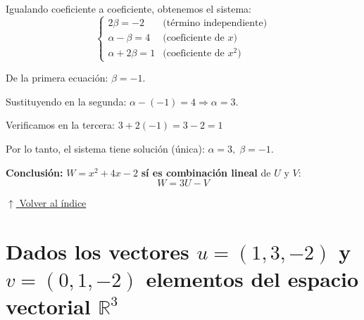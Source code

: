 \documentclass[12pt]{article}
\newcommand{\volverindice}{%
    \vspace{1em}%
    \begin{flushright}%
        \hyperlink{indice}{\small $\uparrow$ Volver al índice}%
    \end{flushright}%
}
\begin{document}
\begin{enumerate}[label=\alph*.-]
    Igualando coeficiente a coeficiente, obtenemos el sistema:
    \[
    \begin{cases}
    2\beta = -2 & \text{(término independiente)}\\
    \alpha-\beta = 4 & \text{(coeficiente de } x\text{)}\\
    \alpha+2\beta = 1 & \text{(coeficiente de } x^2\text{)}
    \end{cases}
    \]

    De la primera ecuación: $\beta=-1$.

    Sustituyendo en la segunda: $\alpha-(-1)=4 \Rightarrow \alpha=3$.

    Verificamos en la tercera: $3+2(-1) = 3-2 = 1$ \checkmark

    Por lo tanto, el sistema tiene solución (única): $\alpha=3,\; \beta=-1$.

    \textbf{Conclusión:} $W=x^2+4x-2$ \textbf{sí es combinación lineal} de $U$ y $V$:
    \[
    W = 3U - V
    \]
\end{enumerate}

\volverindice
\newpage

\section{Dados los vectores $u = (1,3,-2)$ y $v = (0,1,-2)$ elementos del espacio vectorial $\mathbb{R}^3$}
\end{document}
